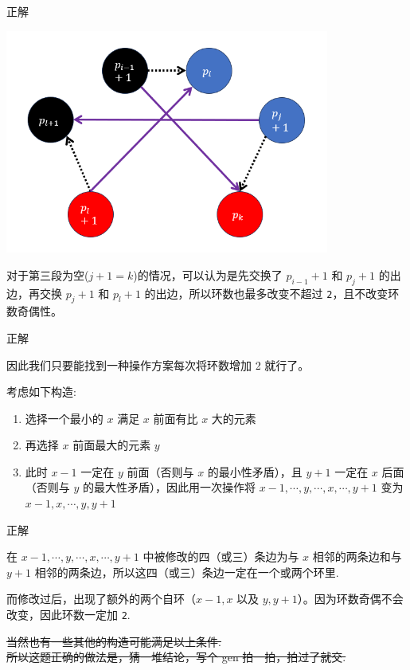 \begin{frame}{正解}

	\includegraphics[width=0.8\textwidth,keepaspectratio]{sources/A4.jpg}

	对于第三段为空($j+1=k$)的情况，可以认为是先交换了 $p_{i-1}+1$ 和 $p_j+1$ 的出边，再交换 $p_j+1$ 和 $p_l+1$ 的出边，所以环数也最多改变不超过 \texttt{2}，且不改变环数奇偶性。

\end{frame}

\begin{frame}{正解}

	因此我们只要能找到一种操作方案每次将环数增加 2 就行了。

	考虑如下构造:

	 \begin{enumerate}
	\item 选择一个最小的 $x$ 满足 $x$ 前面有比 $x$ 大的元素
	\item 再选择 $x$ 前面最大的元素 $y$
	\item 此时 $x-1$ 一定在 $y$ 前面（否则与 $x$ 的最小性矛盾），且 $y+1$ 一定在 $x$ 后面（否则与 $y$ 的最大性矛盾），因此用一次操作将 $x-1,\cdots, y, \cdots, x, \cdots, y+1$ 变为 $x-1, x, \cdots, y, y+1$
	\end{enumerate}

\end{frame}

\begin{frame}{正解}

	在  $x-1,\cdots, y, \cdots, x, \cdots, y+1$  中被修改的四（或三）条边为与 $x$ 相邻的两条边和与 $y+1$ 相邻的两条边，所以这四（或三）条边一定在一个或两个环里.

	而修改过后，出现了额外的两个自环（$x-1, x$ 以及 $y, y+1$）。因为环数奇偶不会改变，因此环数一定加 \texttt{2}. \pause

	\sout{当然也有一些其他的构造可能满足以上条件.}\\ \sout{所以这题正确的做法是，猜一堆结论，写个 gen 拍一拍，拍过了就交.}


\end{frame}